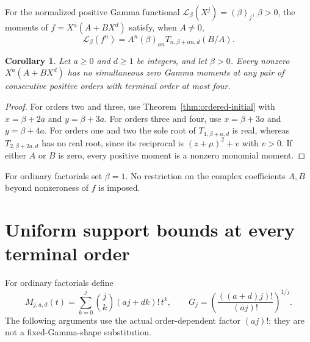 \documentclass[11pt]{article}
\newtheorem{corollary}[theorem]{Corollary}
\begin{document}
For the normalized positive Gamma functional
$\mathcal L_\beta(X^j)=(\beta)_j$, $\beta>0$, the moments of
$f=X^a(A+BX^d)$ satisfy, when $A\ne0$,
\[
 \mathcal L_\beta(f^n)
   =A^n(\beta)_{an}T_{n,\beta+an,d}(B/A).                   \tag{2}\label{eq:moment-normalization}
\]
\begin{corollary}\label{cor:initial}
Let $a\ge0$ and $d\ge1$ be integers, and let $\beta>0$.
Every nonzero $X^a(A+BX^d)$ has no simultaneous zero Gamma moments
at any pair of consecutive positive orders with terminal order
at most four.
\end{corollary}
\begin{proof}
For orders two and three, use Theorem~\ref{thm:ordered-initial}
with $x=\beta+2a$ and $y=\beta+3a$.
For orders three and four, use $x=\beta+3a$ and $y=\beta+4a$.
For orders one and two the sole root of $T_{1,\beta+a,d}$ is real,
whereas $T_{2,\beta+2a,d}$ has no real root, since its reciprocal
is $(z+\mu)^2+v$ with $v>0$.
If either $A$ or $B$ is zero, every positive moment is a nonzero
monomial moment.
\end{proof}
For ordinary factorials set $\beta=1$. No restriction on the complex
coefficients $A,B$ beyond nonzeroness of $f$ is imposed.

\section{Uniform support bounds at every terminal order}
For ordinary factorials define
\[
 M_{j,a,d}(t)=\sum_{k=0}^j\binom jk(aj+dk)!\,t^k,\qquad
 G_j=\left(\frac{((a+d)j)!}{(aj)!}\right)^{1/j}.
\]
The following arguments use the actual order-dependent factor $(aj)!$;
they are not a fixed-Gamma-shape substitution.
\end{document}

